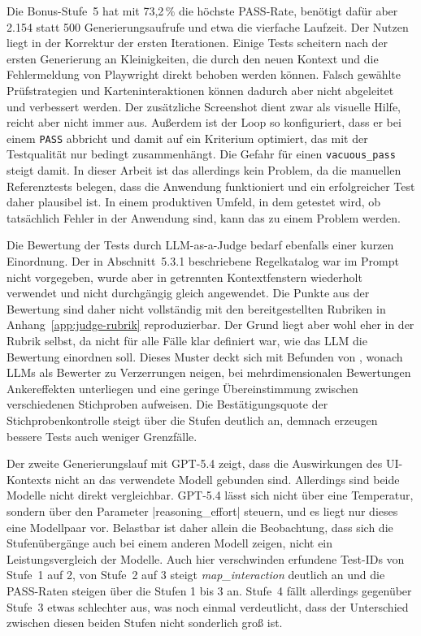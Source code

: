 Die Bonus-Stufe~5 hat mit 73,2\,\% die höchste PASS-Rate, benötigt dafür aber 2.154 statt 500 Generierungsaufrufe und etwa die vierfache Laufzeit. Der Nutzen liegt in der Korrektur der ersten Iterationen. Einige Tests scheitern nach der ersten Generierung an Kleinigkeiten, die durch den neuen Kontext und die Fehlermeldung von Playwright direkt behoben werden können. Falsch gewählte Prüfstrategien und Karteninteraktionen können dadurch aber nicht abgeleitet und verbessert werden. Der zusätzliche Screenshot dient zwar als visuelle Hilfe, reicht aber nicht immer aus. Außerdem ist der Loop so konfiguriert, dass er bei einem \texttt{PASS} abbricht und damit auf ein Kriterium optimiert, das mit der Testqualität nur bedingt zusammenhängt. Die Gefahr für einen \texttt{vacuous\_pass} steigt damit. In dieser Arbeit ist das allerdings kein Problem, da die manuellen Referenztests belegen, dass die Anwendung funktioniert und ein erfolgreicher Test daher plausibel ist. In einem produktiven Umfeld, in dem getestet wird, ob tatsächlich Fehler in der Anwendung sind, kann das zu einem Problem werden.

Die Bewertung der Tests durch LLM-as-a-Judge bedarf ebenfalls einer kurzen Einordnung. Der in Abschnitt~5.3.1 beschriebene Regelkatalog war im Prompt nicht vorgegeben, wurde aber in getrennten Kontextfenstern wiederholt verwendet und nicht durchgängig gleich angewendet. Die Punkte aus der Bewertung sind daher nicht vollständig mit den bereitgestellten Rubriken in Anhang~\ref{app:judge-rubrik} reproduzierbar. Der Grund liegt aber wohl eher in der Rubrik selbst, da nicht für alle Fälle klar definiert war, wie das \ac{LLM} die Bewertung einordnen soll. Dieses Muster deckt sich mit Befunden von \textcite[S.~1]{stureborg_large_2024}, wonach \acp{LLM} als Bewerter zu Verzerrungen neigen, bei mehrdimensionalen Bewertungen Ankereffekten unterliegen und eine geringe Übereinstimmung zwischen verschiedenen Stichproben aufweisen. Die Bestätigungsquote der Stichprobenkontrolle steigt über die Stufen deutlich an, demnach erzeugen bessere Tests auch weniger Grenzfälle.

Der zweite Generierungslauf mit GPT-5.4 zeigt, dass die Auswirkungen des \ac{UI}-Kontexts nicht an das verwendete Modell gebunden sind. Allerdings sind beide Modelle nicht direkt vergleichbar. GPT-5.4 lässt sich nicht über eine Temperatur, sondern über den Parameter \code|reasoning_effort| steuern, und es liegt nur dieses eine Modellpaar vor. Belastbar ist daher allein die Beobachtung, dass sich die Stufenübergänge auch bei einem anderen Modell zeigen, nicht ein Leistungsvergleich der Modelle. Auch hier verschwinden erfundene Test-IDs von Stufe~1 auf 2, von Stufe~2 auf 3 steigt \emph{map\_interaction} deutlich an und die PASS-Raten steigen über die Stufen 1 bis 3 an. Stufe~4 fällt allerdings gegenüber Stufe~3 etwas schlechter aus, was noch einmal verdeutlicht, dass der Unterschied zwischen diesen beiden Stufen nicht sonderlich groß ist.

